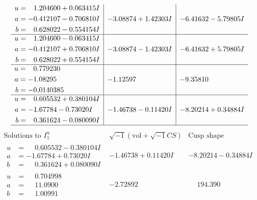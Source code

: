 \documentclass[1p]{elsarticle_modified}
\theoremstyle{definition}
\newcommand{\I}{\sqrt{-1}}
\begin{document}
$$\begin{array}{c|c|c}
\begin{aligned}
u &= \phantom{-}1.204600 + 0.063415 I \\
a &= -0.412107 - 0.706810 I \\
b &= \phantom{-}0.628022 - 0.554154 I\end{aligned}
 & -3.08874 + 1.42303 I & -6.41632 - 5.79805 I \\ \hline\begin{aligned}
u &= \phantom{-}1.204600 - 0.063415 I \\
a &= -0.412107 + 0.706810 I \\
b &= \phantom{-}0.628022 + 0.554154 I\end{aligned}
 & -3.08874 - 1.42303 I & -6.41632 + 5.79805 I \\ \hline\begin{aligned}
u &= \phantom{-}0.779230\phantom{ +0.000000I} \\
a &= -1.08295\phantom{ +0.000000I} \\
b &= -0.0140385\phantom{ +0.000000I}\end{aligned}
 & -1.12597\phantom{ +0.000000I} & -9.35810\phantom{ +0.000000I} \\ \hline\begin{aligned}
u &= \phantom{-}0.605532 + 0.380104 I \\
a &= -1.67784 - 0.73020 I \\
b &= \phantom{-}0.361624 - 0.080090 I\end{aligned}
 & -1.46738 - 0.11420 I & -8.20214 + 0.34884 I\\
 \hline 
 \end{array}$$\newpage$$\begin{array}{c|c|c}  
\text{Solutions to }I^u_{1}& \I (\text{vol} + \sqrt{-1}CS) & \text{Cusp shape}\\
 \hline 
\begin{aligned}
u &= \phantom{-}0.605532 - 0.380104 I \\
a &= -1.67784 + 0.73020 I \\
b &= \phantom{-}0.361624 + 0.080090 I\end{aligned}
 & -1.46738 + 0.11420 I & -8.20214 - 0.34884 I \\ \hline\begin{aligned}
u &= \phantom{-}0.704998\phantom{ +0.000000I} \\
a &= \phantom{-}11.0900\phantom{ +0.000000I} \\
b &= \phantom{-}1.00991\phantom{ +0.000000I}\end{aligned}
 & -2.72892\phantom{ +0.000000I} & \phantom{-}194.390\phantom{ +0.000000I} \\ \hline\begin{aligned}

\end{aligned}
\end{array}$$
\end{document}

